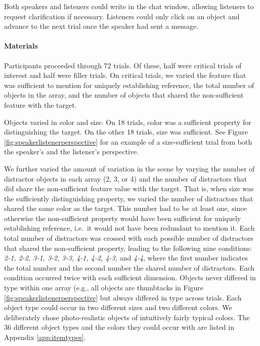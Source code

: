 \documentclass[11pt]{article}
\newcommand{\figref}[1]{Figure \ref{#1}}
\newcommand{\appref}[1]{Appendix \ref{#1}}
\begin{document}
Both speakers and listeners could write in the chat window, allowing listeners to request clarification if necessary. Listeners could only click on an object and advance to the next trial once the speaker had sent a message. 


\paragraph{Materials}

Participants proceeded through 72 trials. Of these, half were critical trials of interest and half were filler trials. On critical trials, we varied the feature that was sufficient to mention for uniquely establishing reference, the total number of objects in the array, and  the number of objects that shared the non-sufficient feature with the target. 

Objects varied in color and size. On 18 trials, color was a sufficient property for distinguishing the target. On the other 18 trials, size was sufficient. See \figref{fig:speakerlistenerperspective} for an example of a size-sufficient trial from both the speaker's and the listener's perspective. 

We further varied the amount of variation in the scene by varying the number of distractor objects in each array (2, 3, or  4) and the number of distractors that did share the non-sufficient feature value with the target. That is, when size was the sufficiently distinguishing property, we varied the number of distractors that shared the same color as the target. This number had to be at least one, since otherwise the non-sufficient property would have been sufficient for uniquely establishing reference, i.e.~it would not have been redundant to mention it. Each total number of distractors was crossed with each possible number of distractors that shared the non-sufficient property, leading to the following nine conditions: \emph{2-1, 2-2, 3-1, 3-2, 3-3, 4-1, 4-2, 4-3,} and \emph{4-4}, where the first number indicates the total number and the second number the shared number of distractors. Each condition occurred twice with each sufficient dimension. Objects never differed in type within one array (e.g., all objects are thumbtacks in \figref{fig:speakerlistenerperspective} but always differed in type across trials. Each object type could occur in two different sizes and two different colors. We deliberately chose photo-realistic objects of intuitively fairly typical colors. The 36 different object types and the colors they could occur with are listed in \appref{app:itemtypes}. 
\end{document}
